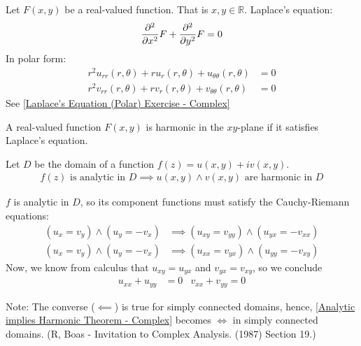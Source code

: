 \documentclass[12pt, english]{book}
\makeatletter
\renewenvironment{proof}[1][\proofname]{\par
	\pushQED{\qed}%
	\normalfont \topsep6\p@\@plus6\p@\relax
	\list{}{%
		\settowidth{\leftmargin}{\itshape\proofname:\hskip\labelsep}%
		\setlength{\labelwidth}{0pt}%
		\setlength{\itemindent}{-\leftmargin}%
	}%
	\item[\hskip\labelsep\itshape#1\@addpunct{:}]\ignorespaces
	}{ \popQED\endlist\@endpefalse}
\makeatother
\begin{document}
	\begin{definition} 
		\label{Laplace's Equation Definition - Complex}
		Let \(F(x,y)\) be a real-valued function. That is \(x,y \in \mathbb{R}\). Laplace's equation: 
		\begin{align*}
			\pdv[2]{x} F + \pdv[2]{y} F = 0
		\end{align*}
		In polar form:
		\begin{align*}
			r^2 u_{rr}(r, \theta) + ru_r(r, \theta) + u_{\theta \theta}(r, \theta) &= 0 \\
			r^2 v_{rr}(r, \theta) + rv_r(r, \theta) + v_{\theta \theta}(r, \theta) &= 0
		\end{align*}
		See \cref{Laplace's Equation (Polar) Exercise - Complex}
	\end{definition}

	\begin{definition}[Harmonic] 
		A real-valued function \(F(x,y)\) is harmonic in the \(xy\)-plane if it satisfies Laplace's equation.
	\end{definition}

	\begin{theorem}
		\label{Analytic implies Harmonic Theorem - Complex}
		Let \(D\) be the domain of a function \(f(z) = u(x,y) + iv(x,y)  \).
		\begin{align*}
			f(z) \text{ is analytic in } D \implies u(x,y) \land v(x,y) \text{ are harmonic in } D
		\end{align*}
	\end{theorem}
	\begin{proof}
		\(f\) is analytic in \(D\), so its component functions must satisfy the Cauchy-Riemann equations: 
		\begin{align*}
			(u_x = v_y)\land(u_y = -v_x) 
				&\implies (u_{xy} = v_{yy})\land(u_{yx} = -v_{xx})  \\
			(u_x = v_y)\land(u_y = -v_x) 
				&\implies (u_{xx} = v_{yx})\land(u_{yy} = -v_{xy}) 
		\end{align*}
		Now, we know from calculus that \(u_{xy} = u_{yx}\) and \(v_{yx} = v_{xy}\), so we conclude
		\begin{align*}
			u_{xx} + u_{yy} &= 0 & v_{xx} + v_{yy} = 0
		\end{align*}
	\end{proof}

	Note: The converse (\(\impliedby\)) is true for simply connected domains, hence, \cref{Analytic implies Harmonic Theorem - Complex} becomes \(\iff\) in simply connected domains. (R, Boas - Invitation to Complex Analysis. (1987) Section 19.)
	
\end{document}
